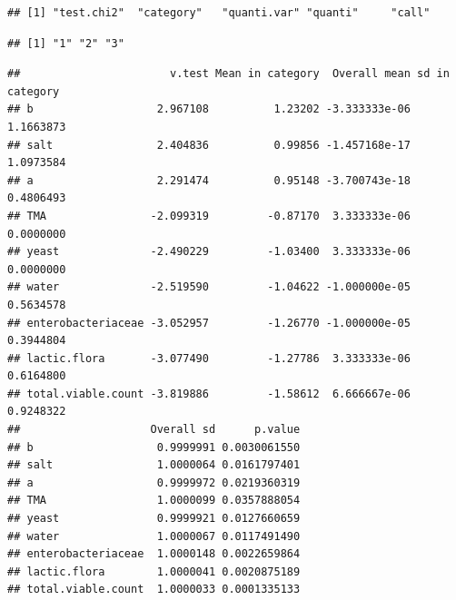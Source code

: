 \documentclass[
]{book}
\newenvironment{Shaded}{\begin{snugshade}}{\end{snugshade}}
\newcommand{\AttributeTok}[1]{\textcolor[rgb]{0.77,0.63,0.00}{#1}}
\newcommand{\FunctionTok}[1]{\textcolor[rgb]{0.00,0.00,0.00}{#1}}
\newcommand{\NormalTok}[1]{#1}
\newcommand{\SpecialCharTok}[1]{\textcolor[rgb]{0.00,0.00,0.00}{#1}}
\newcommand{\StringTok}[1]{\textcolor[rgb]{0.31,0.60,0.02}{#1}}
\begin{document}
\begin{verbatim}
## [1] "test.chi2"  "category"   "quanti.var" "quanti"     "call"
\end{verbatim}

\begin{Shaded}
\end{Shaded}

\begin{verbatim}
## [1] "1" "2" "3"
\end{verbatim}

\begin{Shaded}
\end{Shaded}

\begin{verbatim}
##                       v.test Mean in category  Overall mean sd in category
## b                   2.967108          1.23202 -3.333333e-06      1.1663873
## salt                2.404836          0.99856 -1.457168e-17      1.0973584
## a                   2.291474          0.95148 -3.700743e-18      0.4806493
## TMA                -2.099319         -0.87170  3.333333e-06      0.0000000
## yeast              -2.490229         -1.03400  3.333333e-06      0.0000000
## water              -2.519590         -1.04622 -1.000000e-05      0.5634578
## enterobacteriaceae -3.052957         -1.26770 -1.000000e-05      0.3944804
## lactic.flora       -3.077490         -1.27786  3.333333e-06      0.6164800
## total.viable.count -3.819886         -1.58612  6.666667e-06      0.9248322
##                    Overall sd      p.value
## b                   0.9999991 0.0030061550
## salt                1.0000064 0.0161797401
## a                   0.9999972 0.0219360319
## TMA                 1.0000099 0.0357888054
## yeast               0.9999921 0.0127660659
## water               1.0000067 0.0117491490
## enterobacteriaceae  1.0000148 0.0022659864
## lactic.flora        1.0000041 0.0020875189
## total.viable.count  1.0000033 0.0001335133
\end{verbatim}
\end{document}
